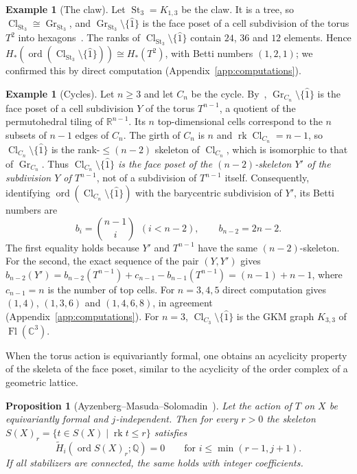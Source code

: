 \documentclass[11pt,a4paper]{article}
\numberwithin{equation}{section}
\theoremstyle{plain}
\newtheorem{proposition}[theorem]{Proposition}
\theoremstyle{definition}
\newtheorem{example}[theorem]{Example}
\theoremstyle{remark}
\newcommand{\Q}{\mathbb{Q}}
\newcommand{\R}{\mathbb{R}}
\newcommand{\C}{\mathbb{C}}
\DeclareMathOperator{\Fl}{Fl}
\DeclareMathOperator{\ord}{ord}
\DeclareMathOperator{\rk}{rk}
\DeclareMathOperator{\Cl}{Cl}
\DeclareMathOperator{\GrH}{Gr}
\DeclareMathOperator{\St}{St}
\begin{document}
\begin{example}[The claw]\label{ex:claw}
Let $\St_3=K_{1,3}$ be the claw. It is a tree, so $\Cl_{\St_3}\cong\GrH_{\St_3}$, and $\GrH_{\St_3}\setminus\{\hat1\}$ is the face poset of a cell subdivision of the torus $T^2$ into hexagons~\cite[Prop.~1.1]{AB24}. The ranks of $\Cl_{\St_3}\setminus\{\hat1\}$ contain $24$, $36$ and $12$ elements. Hence $H_*(\ord(\Cl_{\St_3}\setminus\{\hat1\}))\cong H_*(T^2)$, with Betti numbers $(1,2,1)$; we confirmed this by direct computation (Appendix~\ref{app:computations}).
\end{example}

\begin{example}[Cycles]\label{ex:cycles}
Let $n\geqslant3$ and let $C_n$ be the cycle. By~\cite[Prop.~1.1]{AB24}, $\GrH_{C_n}\setminus\{\hat1\}$ is the face poset of a cell subdivision $Y$ of the torus $T^{n-1}$, a quotient of the permutohedral tiling of $\R^{n-1}$. Its $n$ top-dimensional cells correspond to the $n$ subsets of $n-1$ edges of $C_n$. The girth of $C_n$ is $n$ and $\rk\Cl_{C_n}=n-1$, so $\Cl_{C_n}\setminus\{\hat1\}$ is the rank-$\leqslant(n-2)$ skeleton of $\Cl_{C_n}$, which is isomorphic to that of $\GrH_{C_n}$. Thus \emph{$\Cl_{C_n}\setminus\{\hat1\}$ is the face poset of the $(n-2)$-skeleton $Y'$ of the subdivision $Y$ of $T^{n-1}$}, not of a subdivision of $T^{n-1}$ itself. Consequently, identifying $\ord(\Cl_{C_n}\setminus\{\hat1\})$ with the barycentric subdivision of $Y'$, its Betti numbers are
\[
b_i=\binom{n-1}{i}\ \ (i<n-2),\qquad b_{n-2}=2n-2.
\]
The first equality holds because $Y'$ and $T^{n-1}$ have the same $(n-2)$-skeleton. For the second, the exact sequence of the pair $(Y,Y')$ gives $b_{n-2}(Y')=b_{n-2}(T^{n-1})+c_{n-1}-b_{n-1}(T^{n-1})=(n-1)+n-1$, where $c_{n-1}=n$ is the number of top cells. For $n=3,4,5$ direct computation gives $(1,4)$, $(1,3,6)$ and $(1,4,6,8)$, in agreement (Appendix~\ref{app:computations}). For $n=3$, $\Cl_{C_3}\setminus\{\hat1\}$ is the GKM graph $K_{3,3}$ of $\Fl(\C^3)$.
\end{example}

When the torus action is equivariantly formal, one obtains an acyclicity property of the skeleta of the face poset, similar to the acyclicity of the order complex of a geometric lattice.

\begin{proposition}[Ayzenberg--Masuda--Solomadin~{\cite[Thm.~1]{AMS23}}]\label{prop:AMS}
Let the action of $T$ on $X$ be equivariantly formal and $j$-independent. Then for every $r>0$ the skeleton $S(X)_r=\{t\in S(X)\mid\rk t\leqslant r\}$ satisfies
\[
\tilde H_i(\ord S(X)_r;\Q)=0\qquad\text{for } i\leqslant\min(r-1,j+1).
\]
If all stabilizers are connected, the same holds with integer coefficients.
\end{proposition}
\end{document}
